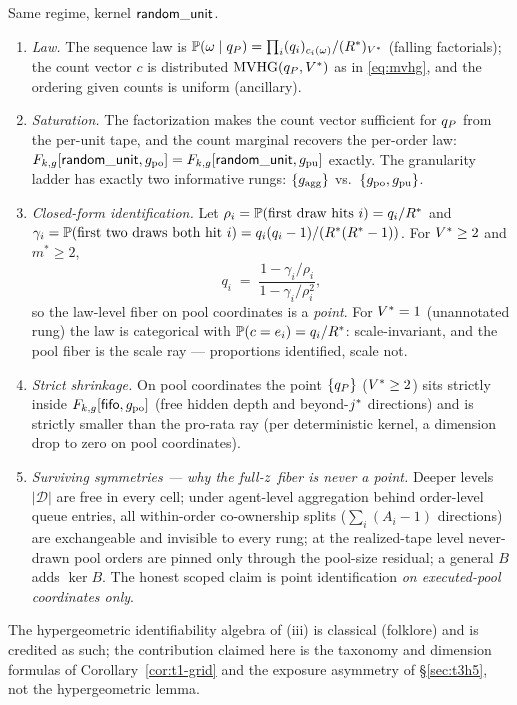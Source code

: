 \begin{proposition}
\label{prop:t1-ru}
Same regime, kernel $\mathsf{random\_unit}$.
\begin{enumerate}
\item[(i)] \emph{Law.} The sequence law is
$\mathbb{P}(\omega \mid q_{P}) = \prod_i (q_i)_{c_i(\omega)} / (R^{*})_{V^{*}}$
(falling factorials); the count vector $c$ is distributed $\operatorname{MVHG}(q_{P},
V^{*})$ as in \eqref{eq:mvhg}, and the ordering given counts is uniform
(ancillary).
\item[(ii)] \emph{Saturation.} The factorization makes the count vector
sufficient for $q_{P}$ from the per-unit tape, and the count marginal recovers
the per-order law: $F_{k,g}[\mathsf{random\_unit},g_{\mathrm{po}}] = F_{k,g}[\mathsf{random\_unit},g_{\mathrm{pu}}]$ exactly. The
granularity ladder has exactly two informative rungs: $\{g_{\mathrm{agg}}\}$ vs.\
$\{g_{\mathrm{po}}, g_{\mathrm{pu}}\}$.
\item[(iii)] \emph{Closed-form identification.} Let
$\rho_i = \mathbb{P}(\text{first draw hits } i) = q_i/R^{*}$ and
$\gamma_i = \mathbb{P}(\text{first two draws both hit } i) =
q_i(q_i-1)/(R^{*}(R^{*}-1))$. For $V^{*} \geq 2$ and $m^{*} \geq 2$,
\[
q_i \;=\; \frac{1 - \gamma_i/\rho_i}{1 - \gamma_i/\rho_i^{2}} ,
\]
so the law-level fiber on pool coordinates is a \emph{point}. For $V^{*} =
1$ (unannotated rung) the law is categorical with $\mathbb{P}(c = e_i) =
q_i/R^{*}$: scale-invariant, and the pool fiber is the scale ray ---
proportions identified, scale not.
\item[(iv)] \emph{Strict shrinkage.} On pool coordinates the point
$\{q_{P}\}$ ($V^{*} \geq 2$) sits strictly inside
$F_{k,g}[\mathsf{fifo},g_{\mathrm{po}}]$ (free hidden depth and beyond-$j^{*}$ directions) and
is strictly smaller than the pro-rata ray (per deterministic kernel, a
dimension drop to zero on pool coordinates).
\item[(v)] \emph{Surviving symmetries --- why the full-$z$ fiber is
never a point.} Deeper levels $|\mathcal{D}|$ are free in every cell; under
agent-level aggregation behind order-level queue entries, all within-order
co-ownership splits ($\sum_i (A_i - 1)$ directions) are exchangeable and
invisible to every rung; at the realized-tape level never-drawn pool orders
are pinned only through the pool-size residual; a general $B$ adds $\ker B$.
The honest scoped claim is point identification \emph{on executed-pool
coordinates only}.
\end{enumerate}
The hypergeometric identifiability algebra of (iii) is classical (folklore)
and is credited as such; the contribution claimed here is the taxonomy and
dimension formulas of Corollary~\ref{cor:t1-grid} and the exposure asymmetry
of \S\ref{sec:t3h5}, not the hypergeometric lemma.
\end{proposition}

